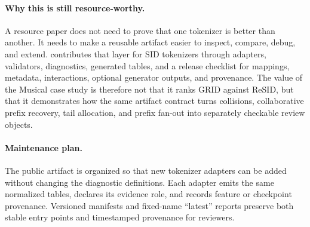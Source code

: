 \paragraph{Why this is still resource-worthy.}
A resource paper does not need to prove that one tokenizer is better than
another. It needs to make a reusable artifact easier to inspect, compare,
debug, and extend. \tool contributes that layer for SID tokenizers through
adapters, validators, diagnostics, generated tables, and a release checklist
for mappings, metadata, interactions, optional generator outputs, and
provenance. The value of the Musical case study is therefore not that it ranks
GRID against ReSID, but that it demonstrates how the same artifact contract
turns collisions, collaborative prefix recovery, tail allocation, and prefix
fan-out into separately checkable review objects.

\paragraph{Maintenance plan.}
The public artifact is organized so that new tokenizer adapters can be added
without changing the diagnostic definitions. Each adapter emits the same
normalized tables, declares its evidence role, and records feature or checkpoint
provenance. Versioned manifests and fixed-name ``latest'' reports preserve both
stable entry points and timestamped provenance for reviewers.

